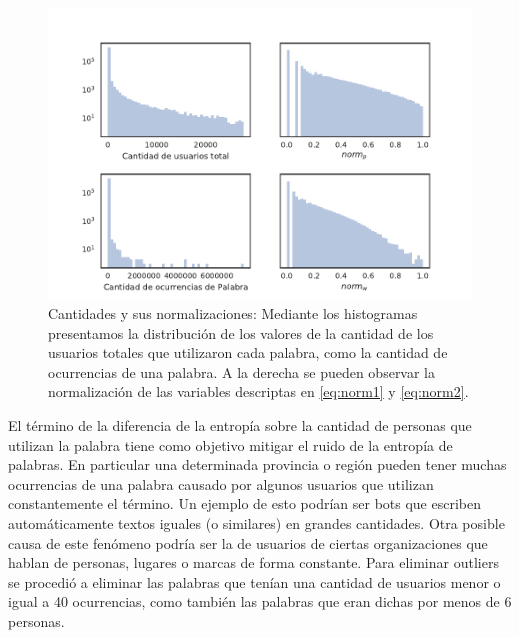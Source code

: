 
\begin{figure}[!ht]
\centering
\includegraphics[width=1.0\textwidth]{./images/train/sinFiltro/cantNorms_sinFiltro.pdf}
\caption{Cantidades y sus normalizaciones: Mediante los histogramas presentamos la distribución de los valores de la cantidad de los usuarios totales que utilizaron cada palabra, como la cantidad de ocurrencias de una palabra. A la derecha se pueden observar la normalización de las variables descriptas en \ref{eq:norm1} y \ref{eq:norm2}.} 
\label{fig:cantNorms} 
\end{figure}

El término de la diferencia de la entropía sobre la cantidad de personas que utilizan la palabra tiene como objetivo mitigar el ruido de la entropía de palabras. En particular una determinada provincia o región pueden tener muchas ocurrencias de una palabra causado por algunos usuarios que utilizan constantemente el término. Un ejemplo de esto podrían ser bots que escriben automáticamente textos iguales (o similares) en grandes cantidades. Otra posible causa de este fenómeno podría ser la de usuarios de ciertas organizaciones que hablan de personas, lugares o marcas de forma constante. 
Para eliminar outliers se procedió a eliminar las palabras que tenían una cantidad de usuarios menor o igual a 40 ocurrencias, como también las palabras que eran dichas por menos de 6 personas. 

